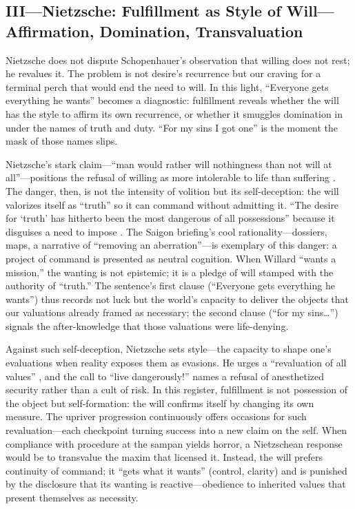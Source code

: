\subsection*{III—Nietzsche: Fulfillment as Style of Will—Affirmation, Domination, Transvaluation}
\label{ssec:iii-nietzsche}
Nietzsche does not dispute Schopenhauer's observation that willing does not rest; he revalues
it. The problem is not desire's recurrence but our craving for a terminal perch that would end
the need to will. In this light, ``Everyone gets everything he wants'' becomes a diagnostic:
fulfillment reveals whether the will has the style to affirm its own recurrence, or whether it
smuggles domination in under the names of truth and duty. ``For my sins I got one'' is the
moment the mask of those names slips.

Nietzsche's stark claim—``man would rather will nothingness than not will at all''—positions
the refusal of willing as more intolerable to life than suffering
\parencite[III.28, p.~162]{NietzscheGenealogy1994}. The danger, then, is not the intensity of
volition but its self-deception: the will valorizes itself as ``truth'' so it can command
without admitting it. ``The desire for `truth' has hitherto been the most dangerous of all
possessions'' because it disguises a need to impose \parencite[\S 34]{NietzscheBGE1990}.
The Saigon briefing's cool rationality—dossiers, maps, a narrative of ``removing an
aberration''—is exemplary of this danger: a project of command is presented as neutral cognition.
When Willard ``wants a mission,'' the wanting is not epistemic; it is a pledge of will stamped
with the authority of ``truth.'' The sentence's first clause (``Everyone gets everything he
wants'') thus records not luck but the world's capacity to deliver the objects that our
valuations already framed as necessary; the second clause (``for my sins\ldots'') signals
the after-knowledge that those valuations were life-denying.

Against such self-deception, Nietzsche sets style—the capacity to shape one's evaluations when
reality exposes them as evasions. He urges a ``revaluation of all values''
\parencite[\S\S 203--211]{NietzscheBGE1990}, and the call to ``live dangerously!''
\parencite[\S 283]{NietzscheBGE1990} names a refusal of anesthetized security rather than a
cult of risk. In this register, fulfillment is not possession of the object but self-formation:
the will confirms itself by changing its own measure. The upriver progression continuously
offers occasions for such revaluation—each checkpoint turning success into a new claim on the
self. When compliance with procedure at the sampan yields horror, a Nietzschean response would
be to transvalue the maxim that licensed it. Instead, the will prefers continuity of command;
it ``gets what it wants'' (control, clarity) and is punished by the disclosure that its wanting
is reactive—obedience to inherited values that present themselves as necessity.

